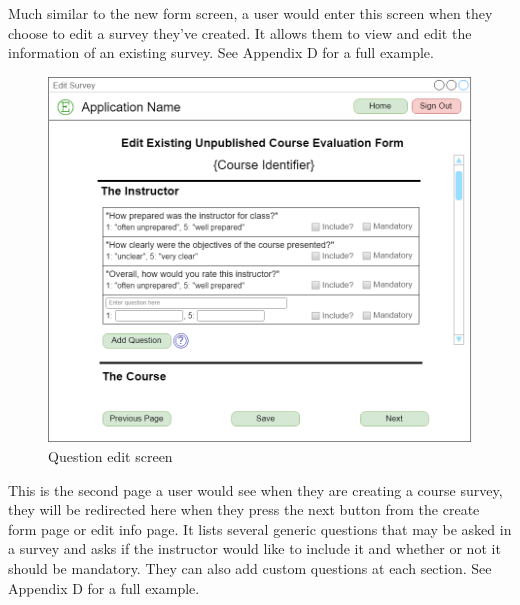 \documentclass{article}
\begin{document}
Much similar to the new form screen, a user would enter this screen when they choose to edit a survey they've created. It allows them to view and edit the information of an existing survey. See Appendix D for a full example.

\begin{center}
\begin{figure}[H]
    \centering
    \caption{Question edit screen}
    \includegraphics[scale=.30]{images/questions_screen.png}
\end{figure}
\end{center}

This is the second page a user would see when they are creating a course survey, they will be redirected here when they press the next button from the create form page or edit info page. It lists several generic questions that may be asked in a survey and asks if the instructor would like to include it and whether or not it should be mandatory. They can also add custom questions at each section.  See Appendix D for a full example.
\end{document}
